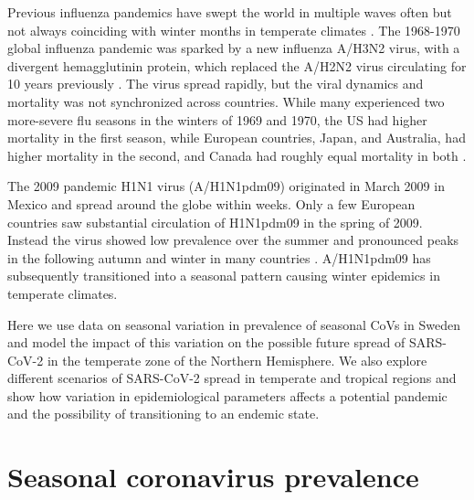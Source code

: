 \documentclass[rmp, reprint, superscriptaddress, floatfix,amsmath]{revtex4-1}
\begin{document}
Previous influenza pandemics have swept the world in multiple waves often but not always coinciding with winter months in temperate climates \citep{taubenberger_1918_2019,viboud_multinational_2005,viboud_global_2016,amato-gauci_surveillance_2011}. 
The 1968-1970 global influenza pandemic was sparked by a new influenza A/H3N2 virus, with a divergent hemagglutinin protein, which replaced the A/H2N2 virus circulating for 10 years previously \citep{viboud_multinational_2005}. The virus spread rapidly, but the viral dynamics and mortality was not synchronized across countries.
While many experienced two more-severe flu seasons in the winters of 1969 and 1970, the US had higher mortality in the first season, while European countries, Japan, and Australia, had higher mortality in the second, and Canada had roughly equal mortality in both \citep{viboud_multinational_2005}.

The 2009 pandemic H1N1 virus (A/H1N1pdm09) originated in March 2009 in Mexico and spread around the globe within weeks.
Only a few European countries saw substantial circulation of H1N1pdm09 in the spring of 2009. Instead the virus showed low prevalence over the summer and pronounced peaks in the following autumn and winter in many countries \citep{amato-gauci_surveillance_2011}.
A/H1N1pdm09 has subsequently transitioned into a seasonal pattern causing winter epidemics in temperate climates.

Here we use data on seasonal variation in prevalence of seasonal CoVs in Sweden and model the impact of this variation on the possible future spread of SARS-CoV-2 in the temperate zone of the Northern Hemisphere. 
We also explore different scenarios of SARS-CoV-2 spread in temperate and tropical regions and show how variation in epidemiological parameters affects a potential pandemic and the possibility of transitioning to an endemic state. 

\section{Seasonal coronavirus prevalence} 
\end{document}

